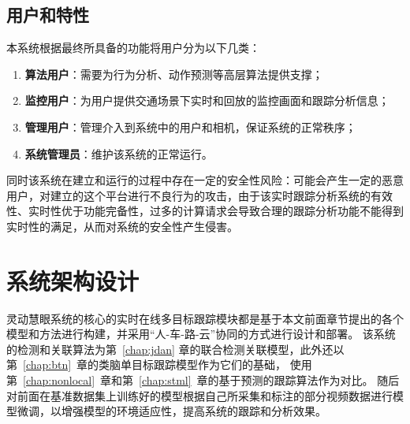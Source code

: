 
\subsection{用户和特性}
本系统根据最终所具备的功能将用户分为以下几类：
\begin{enumerate} 
	\item \textbf{算法用户}：需要为行为分析、动作预测等高层算法提供支撑；
	
	\item \textbf{监控用户}：为用户提供交通场景下实时和回放的监控画面和跟踪分析信息；
	
	\item \textbf{管理用户}：管理介入到系统中的用户和相机，保证系统的正常秩序；
	
	\item \textbf{系统管理员}：维护该系统的正常运行。
\end{enumerate}


同时该系统在建立和运行的过程中存在一定的安全性风险：可能会产生一定的恶意用户，对建立的这个平台进行不良行为的攻击，由于该实时跟踪分析系统的有效性、实时性优于功能完备性，过多的计算请求会导致合理的跟踪分析功能不能得到实时性的满足，从而对系统的安全性产生侵害。





\section{系统架构设计}
灵动慧眼系统的核心的实时在线多目标跟踪模块都是基于本文前面章节提出的各个模型和方法进行构建，并采用“人-车-路-云”协同的方式进行设计和部署。
该系统的检测和关联算法为第~\ref{chap:jdan} 章的联合检测关联模型，此外还以第~\ref{chap:btn}~章的类脑单目标跟踪模型作为它们的基础，
使用第~\ref{chap:nonlocal}~章和第~\ref{chap:stml}~章的基于预测的跟踪算法作为对比。
随后对前面在基准数据集上训练好的模型根据自己所采集和标注的部分视频数据进行模型微调，以增强模型的环境适应性，提高系统的跟踪和分析效果。

